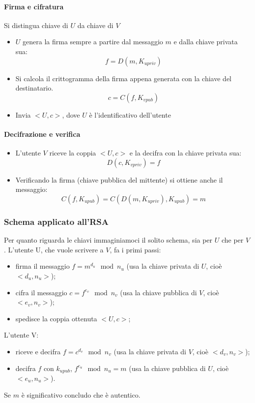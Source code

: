 \paragraph{Firma e cifratura} Si distingua chiave di $U$ da chiave di $V$
\begin{itemize}
    \item $U$ genera la firma sempre a partire dal messaggio $m$ e dalla chiave privata sua:
    $$ f = D(m, K_{upriv}) $$
    \item Si calcola il crittogramma della firma appena generata con la chiave del destinatario.
    $$ c = C(f, K_{vpub}) $$
    \item Invia $<U, c>$, dove $U$ è l'identificativo dell'utente
\end{itemize}
\paragraph{Decifrazione e verifica} 
\begin{itemize}
	\item L'utente $V$ riceve la coppia $<U, c>$ e la decifra con la chiave privata sua:
	$$ D(c, K_{vpriv}) = f $$
	\item Verificando la firma (chiave pubblica del mittente) si ottiene anche il messaggio:
	$$ C(f, K_{upub}) = C(D(m, K_{upriv}), K_{upub}) = m $$
\end{itemize}
\subsubsection{Schema applicato all'RSA}
Per quanto riguarda le chiavi immaginiamoci il solito schema, sia per $U$ che per $V$. L'utente U, che vuole scrivere a $V$, fa i primi passi:
\begin{itemize}
    \item firma il messaggio $f = m^{d_u} \mod n_u$ (usa la chiave privata di $U$, cioè $<d_u,n_u>$);
    \item cifra il messaggio $c = f^{e_v} \mod n_v$ (usa la chiave pubblica di $V$, cioè $<e_v,n_v>$);
    \item spedisce la coppia ottenuta $<U, c>$;
\end{itemize}
L'utente V:
\begin{itemize}
    \item riceve e decifra $f = c^{d_v} \mod n_v$ (usa la chiave privata di $V$, cioè $<d_v,n_v>$);
    \item decifra $f$ con $k_{upub}$, $f^{e_u} \mod n_u = m$ (usa la chiave pubblica di $U$, cioè $<e_u,n_u>$).
\end{itemize}
Se $m$ è significativo concludo che è autentico.


